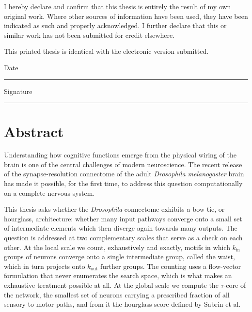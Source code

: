 \documentclass[12pt,a4paper,oneside]{article}
\theoremstyle{definition}
\theoremstyle{plain}
\newcommand{\Drosophila}{\textit{Drosophila melanogaster}}
\newcommand{\Dros}{\textit{Drosophila}}
\newcommand{\kin}{k_{\mathrm{in}}}
\newcommand{\kout}{k_{\mathrm{out}}}
\begin{document}
I hereby declare and confirm that this thesis is entirely the result of my
own original work. Where other sources of information have been used, they
have been indicated as such and properly acknowledged. I further declare
that this or similar work has not been submitted for credit elsewhere.

This printed thesis is identical with the electronic version submitted.

\vspace{2.5cm}

\noindent
\begin{minipage}[t]{0.45\textwidth}
\raggedright
Date\\[1.4cm]
\rule{5cm}{0.4pt}
\end{minipage}
\hfill
\begin{minipage}[t]{0.45\textwidth}
\raggedleft
Signature\\[1.4cm]
\rule{5cm}{0.4pt}
\end{minipage}

\clearpage

\section*{Abstract}
\enlargethispage{2\baselineskip}

Understanding how cognitive functions emerge from the physical wiring of the
brain is one of the central challenges of modern neuroscience. The recent
release of the synapse-resolution connectome of the adult \Drosophila{}
brain has made it possible, for the first time, to address this question
computationally on a complete nervous system.

This thesis asks whether the \Dros{} connectome exhibits a bow-tie, or
hourglass, architecture: whether many input pathways converge onto a small
set of intermediate elements which then diverge again towards many outputs.
The question is addressed at two complementary scales that serve as a check
on each other. At the local scale we count, exhaustively and exactly, motifs
in which $\kin$ groups of neurons converge onto a single intermediate group,
called the waist, which in turn projects onto $\kout$ further groups. The
counting uses a flow-vector formulation that never enumerates the search
space, which is what makes an exhaustive treatment possible at all. At the
global scale we compute the $\tau$-core of the network, the smallest set of
neurons carrying a prescribed fraction of all sensory-to-motor paths, and
from it the hourglass score defined by Sabrin et al.
\end{document}
